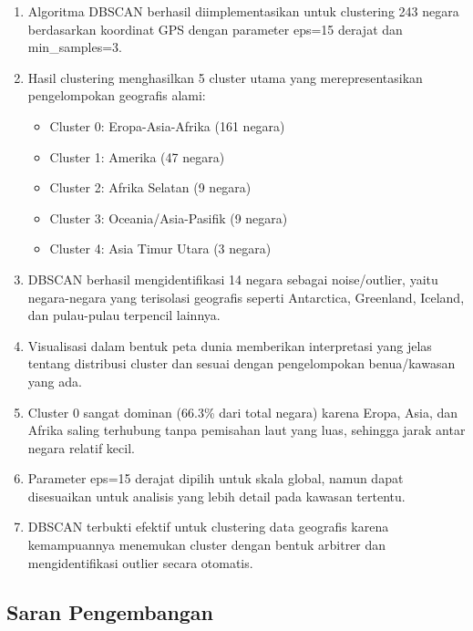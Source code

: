 \documentclass[12pt,a4paper]{article}
\begin{document}
\begin{enumerate}
    \item Algoritma DBSCAN berhasil diimplementasikan untuk clustering 243 negara berdasarkan koordinat GPS dengan parameter eps=15 derajat dan min\_samples=3.
    
    \item Hasil clustering menghasilkan 5 cluster utama yang merepresentasikan pengelompokan geografis alami:
    \begin{itemize}
        \item Cluster 0: Eropa-Asia-Afrika (161 negara)
        \item Cluster 1: Amerika (47 negara)
        \item Cluster 2: Afrika Selatan (9 negara)
        \item Cluster 3: Oceania/Asia-Pasifik (9 negara)
        \item Cluster 4: Asia Timur Utara (3 negara)
    \end{itemize}
    
    \item DBSCAN berhasil mengidentifikasi 14 negara sebagai noise/outlier, yaitu negara-negara yang terisolasi geografis seperti Antarctica, Greenland, Iceland, dan pulau-pulau terpencil lainnya.
    
    \item Visualisasi dalam bentuk peta dunia memberikan interpretasi yang jelas tentang distribusi cluster dan sesuai dengan pengelompokan benua/kawasan yang ada.
    
    \item Cluster 0 sangat dominan (66.3\% dari total negara) karena Eropa, Asia, dan Afrika saling terhubung tanpa pemisahan laut yang luas, sehingga jarak antar negara relatif kecil.
    
    \item Parameter eps=15 derajat dipilih untuk skala global, namun dapat disesuaikan untuk analisis yang lebih detail pada kawasan tertentu.
    
    \item DBSCAN terbukti efektif untuk clustering data geografis karena kemampuannya menemukan cluster dengan bentuk arbitrer dan mengidentifikasi outlier secara otomatis.
\end{enumerate}

\subsection{Saran Pengembangan}
\end{document}
